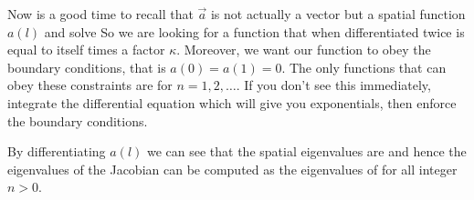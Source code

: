 Now is a good time to recall that $\vec{a}$ is not actually a vector but a spatial function $a(l)$ and solve
So we are looking for a function that when differentiated twice is equal to itself times a factor $\kappa$. Moreover, we want our function to obey the boundary conditions, that is $a(0)=a(1)=0$. The only functions that can obey these constraints are
for $n=1,2,\ldots$. If you don't see this immediately, integrate the differential equation which will give you exponentials, then enforce the boundary conditions. 

By differentiating $a(l)$ we can see that the spatial eigenvalues are 
and hence the eigenvalues of the Jacobian can be computed as the eigenvalues of 
for all integer $n>0$. 
